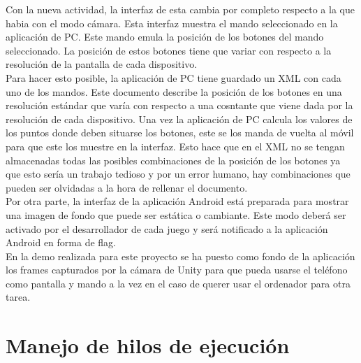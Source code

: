 Con la nueva actividad, la interfaz de esta cambia por completo respecto a la que habia con el modo c\'amara. Esta interfaz muestra el mando seleccionado en la aplicaci\'on de PC. Este mando emula la posici\'on de los botones del mando seleccionado. La posici\'on de estos botones tiene que variar con respecto a la resoluci\'on de la pantalla de cada dispositivo.
\\
 Para hacer esto posible, la aplicaci\'on de PC tiene guardado un XML con cada uno de los mandos. Este documento describe la posici\'on de los botones en una resoluci\'on est\'andar que var\'ia con respecto a una cosntante que viene dada por la resoluci\'on de cada dispositivo. Una vez la aplicaci\'on de PC calcula los valores de los puntos donde deben situarse los botones, este se los manda de vuelta al m\'ovil para que este los muestre en la interfaz. Esto hace que en el XML no se tengan almacenadas todas las posibles combinaciones de la posici\'on de los botones ya que esto ser\'ia un trabajo tedioso y por un error humano, hay combinaciones que pueden ser olvidadas a la hora de rellenar el documento.
\\
Por otra parte, la interfaz de la aplicaci\'on Android est\'a preparada para mostrar una imagen de fondo que puede ser est\'atica o cambiante. Este modo deber\'a ser activado por el desarrollador de cada juego y ser\'a notificado a la aplicaci\'on Android en forma de flag. 
\\
En la demo realizada para este proyecto se ha puesto como fondo de la aplicaci\'on los frames capturados por la c\'amara de Unity para que pueda usarse el tel\'efono como pantalla y mando a la vez en el caso de querer usar el ordenador para otra tarea. 
\section{Manejo de hilos de ejecuci\'on}
\label{cap5:sec:hilos}

